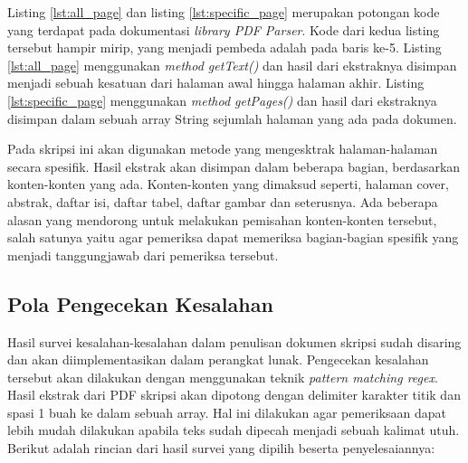 Listing \ref{lst:all_page} dan listing \ref{lst:specific_page} merupakan potongan kode yang terdapat pada dokumentasi \textit{library PDF Parser}. Kode dari kedua listing tersebut hampir mirip, yang menjadi pembeda adalah pada baris ke-5. Listing \ref{lst:all_page} menggunakan \textit{method getText()} dan hasil dari ekstraknya disimpan menjadi sebuah kesatuan dari halaman awal hingga halaman akhir. Listing \ref{lst:specific_page} menggunakan \textit{method getPages()} dan hasil dari ekstraknya disimpan dalam sebuah array String sejumlah halaman yang ada pada dokumen.

Pada skripsi ini akan digunakan metode yang mengesktrak halaman-halaman secara spesifik. Hasil ekstrak akan disimpan dalam beberapa bagian, berdasarkan konten-konten yang ada. Konten-konten yang dimaksud seperti, halaman cover, abstrak, daftar isi, daftar tabel, daftar gambar dan seterusnya. Ada beberapa alasan yang mendorong untuk melakukan pemisahan konten-konten tersebut, salah satunya yaitu agar pemeriksa dapat memeriksa bagian-bagian spesifik yang menjadi tanggungjawab dari pemeriksa tersebut.

\subsection{Pola Pengecekan Kesalahan}
Hasil survei kesalahan-kesalahan dalam penulisan dokumen skripsi sudah disaring dan akan diimplementasikan dalam perangkat lunak. Pengecekan kesalahan tersebut akan dilakukan dengan menggunakan teknik \textit{pattern matching regex}. Hasil ekstrak dari PDF skripsi akan dipotong dengan delimiter karakter titik dan spasi 1 buah ke dalam sebuah array. Hal ini dilakukan agar pemeriksaan dapat lebih mudah dilakukan apabila teks sudah dipecah menjadi sebuah kalimat utuh. Berikut adalah rincian dari hasil survei yang dipilih beserta penyelesaiannya:

